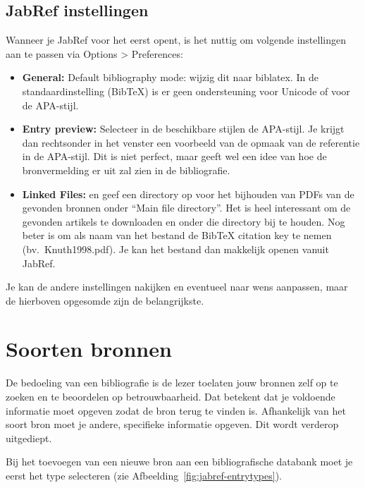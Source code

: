 \subsection{JabRef instellingen}%
\label{sub:jabref_instellingen}

Wanneer je JabRef voor het eerst opent, is het nuttig om volgende instellingen aan te passen via Options > Preferences:

\begin{itemize}
  \item \textbf{General:} Default bibliography mode: wijzig dit naar biblatex. In de standaardinstelling (BibTeX) is er geen ondersteuning voor Unicode of voor de APA-stijl.
  \item \textbf{Entry preview:} Selecteer in de beschikbare stijlen de APA-stijl. Je krijgt dan rechtsonder in het venster een voorbeeld van de opmaak van de referentie in de APA-stijl. Dit is niet perfect, maar geeft wel een idee van hoe de bronvermelding er uit zal zien in de bibliografie.
  \item \textbf{Linked Files:} en geef een directory op voor het bijhouden van PDFs van de gevonden bronnen onder ``Main file directory''. Het is heel interessant om de gevonden artikels te downloaden en onder die directory bij te houden. Nog beter is om als naam van het bestand de BibTeX citation key te nemen (bv.\ Knuth1998.pdf). Je kan het bestand dan makkelijk openen vanuit JabRef.
\end{itemize}

Je kan de andere instellingen nakijken en eventueel naar wens aanpassen, maar de hierboven opgesomde zijn de belangrijkste.

\section{Soorten bronnen}%
\label{sec:soorten_bronnen}

De bedoeling van een bibliografie is de lezer toelaten jouw bronnen zelf op te zoeken en te beoordelen op betrouwbaarheid. Dat betekent dat je voldoende informatie moet opgeven zodat de bron terug te vinden is. Afhankelijk van het soort bron moet je andere, specifieke informatie opgeven. Dit wordt verderop uitgediept.

Bij het toevoegen van een nieuwe bron aan een bibliografische databank moet je eerst het type selecteren (zie Afbeelding~\ref{fig:jabref-entrytypes}).


